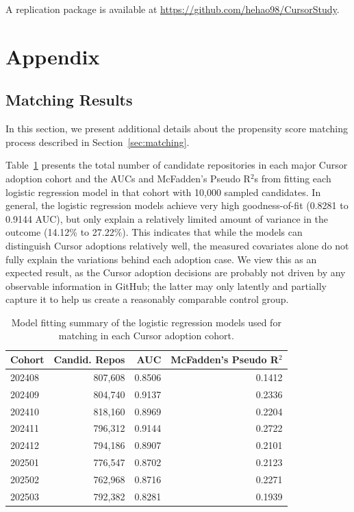 A replication package is available at \url{https://github.com/hehao98/CursorStudy}.

\section{Appendix}

\subsection{Matching Results}
\label{sec:appendix-matching}

In this section, we present additional details about the propensity score matching process described in Section~\ref{sec:matching}.

Table~\ref{tab:matching} presents the total number of candidate repositories in each major Cursor adoption cohort and the AUCs and McFadden's Pseudo R$^2$s from fitting each logistic regression model in that cohort with 10,000 sampled candidates.
In general, the logistic regression models achieve very high goodness-of-fit (0.8281 to 0.9144 AUC), but only explain a relatively limited amount of variance in the outcome (14.12\% to 27.22\%).
This indicates that while the models can distinguish Cursor adoptions relatively well, the measured covariates alone do not fully explain the variations behind each adoption case.
We view this as an expected result, as the Cursor adoption decisions are probably not driven by any observable information in GitHub; the latter may only latently and partially capture it to help us create a reasonably comparable control group.

\begin{table}
\centering
\small
\caption{Model fitting summary of the logistic regression models used for matching in each Cursor adoption cohort. }
\label{tab:matching}
\begin{tabular}{lrrr}
\toprule
Cohort & Candid. Repos & AUC & McFadden's Pseudo R$^2$ \\
\midrule
202408 & 807,608 & 0.8506 & 0.1412 \\
202409 & 804,740 & 0.9137 & 0.2336 \\
202410 & 818,160 & 0.8969 & 0.2204 \\
202411 & 796,312 & 0.9144 & 0.2722 \\
202412 & 794,186 & 0.8907 & 0.2101 \\
202501 & 776,547 & 0.8702 & 0.2123 \\
202502 & 762,968 & 0.8716 & 0.2271 \\
202503 & 792,382 & 0.8281 & 0.1939 \\
\bottomrule
\end{tabular}
\end{table}

